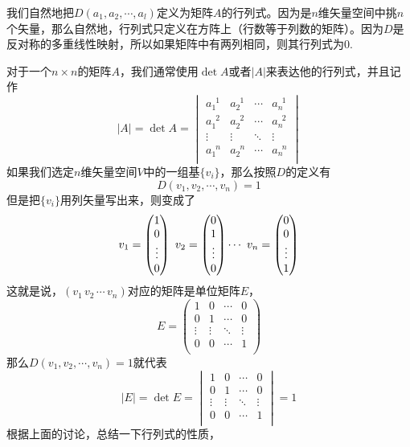 \documentclass[11pt,a4paper,openany]{book}%
\theoremstyle{plain}%
\begin{document}
\indent 我们自然地把$D(a_1,a_2,\cdots,a_l)$定义为矩阵$A$的行列式。因为是$n$维矢量空间中挑$n$个矢量，那么自然地，行列式只定义在方阵上（行数等于列数的矩阵）。因为$D$是反对称的多重线性映射，所以如果矩阵中有两列相同，则其行列式为0.

对于一个$n\times n$的矩阵$A$，我们通常使用$\det A$或者$|A|$来表达他的行列式，并且记作
\[
|A|=\det A=
\begin{vmatrix}
a_{1}^{\,\,\,1} & a_{2}^{\,\,\,1} & \cdots & a_{n}^{\,\,\,1}\\
a_{1}^{\,\,\,2} & a_{2}^{\,\,\,2} & \cdots & a_{n}^{\,\,\,2}\\
\vdots & \vdots & \ddots & \vdots \\
a_{1}^{\,\,\,n} & a_{2}^{\,\,\,n} & \cdots & a_{n}^{\,\,\,n}\\
\end{vmatrix}
\]
\indent 如果我们选定$n$维矢量空间$V$中的一组基$\{v_i\}$，那么按照$D$的定义有
\[
D(v_1,v_2,\cdots,v_n)=1
\]
但是把$\{v_i\}$用列矢量写出来，则变成了
\[
v_1=\begin{pmatrix}
1 \\
0 \\
\vdots \\
0\\
\end{pmatrix}
\,\,
v_2=\begin{pmatrix}
0 \\
1 \\
\vdots \\
0\\
\end{pmatrix}
\cdots\\
\,\,
v_n=\begin{pmatrix}
0 \\
0 \\
\vdots \\
1\\
\end{pmatrix}
\]
这就是说，$(v_1\, v_2\, \cdots\, v_n)$对应的矩阵是单位矩阵$E$，
\[
E=\begin{pmatrix}
1 & 0 & \cdots & 0\\
0 & 1 & \cdots & 0\\
\vdots & \vdots & \ddots & \vdots \\
0 & 0 & \cdots & 1\\
\end{pmatrix}
\]
那么$D(v_1,v_2,\cdots,v_n)=1$就代表
\[
|E|=\det E=
\begin{vmatrix}
1 & 0 & \cdots & 0\\
0 & 1 & \cdots & 0\\
\vdots & \vdots & \ddots & \vdots \\
0 & 0 & \cdots & 1\\
\end{vmatrix}
=1
\]
根据上面的讨论，总结一下行列式的性质，
\end{document}
